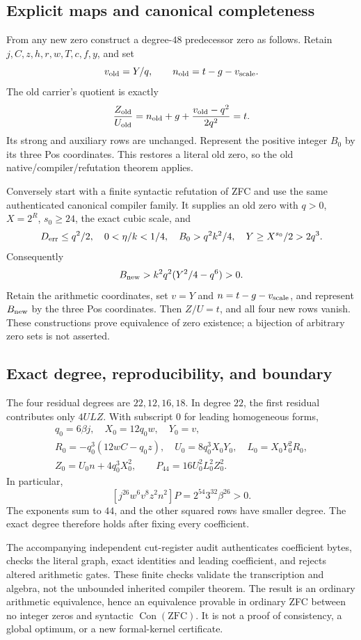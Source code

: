 \subsection{Explicit maps and canonical completeness}
From any new zero construct a degree-$48$ predecessor zero as follows.
Retain $j,C,z,h,r,w,T,c,f,y$, and set
\[
 v_{\rm old}=Y/q,\qquad n_{\rm old}=t-g-v_{\rm scale}.
\]
The old carrier's quotient is exactly
\[
 \frac{Z_{\rm old}}{U_{\rm old}}
 =n_{\rm old}+g+\frac{v_{\rm old}-q^2}{2q^2}=t.
\]
Its strong and auxiliary rows are unchanged. Represent the positive
integer $B_0$ by its three Pos coordinates. This restores a literal
old zero, so the old native/compiler/refutation theorem applies.

Conversely start with a finite syntactic refutation of ZFC and use the
same authenticated canonical compiler family. It supplies an old zero
with $q>0$, $X=2^R$, $s_0\ge24$, the exact cubic scale, and
\[
 D_{\rm err}\le q^2/2,\quad 0<\eta/k<1/4,\quad
 B_0>q^2k^2/4,\quad Y\ge X^{s_0}/2>2q^3.
\]
Consequently
\[
 B_{\rm new}>k^2q^2(Y^2/4-q^6)>0.
\]
Retain the arithmetic coordinates, set $v=Y$ and
$n=t-g-v_{\rm scale}$, and represent $B_{\rm new}$ by the three Pos
coordinates. Then $Z/U=t$, and all four new rows vanish.
These constructions prove equivalence of zero existence; a bijection
of arbitrary zero sets is not asserted.

\subsection{Exact degree, reproducibility, and boundary}
The four residual degrees are $22,12,16,18$. In degree $22$, the
first residual contributes only $4ULZ$. With subscript $0$ for
leading homogeneous forms,
\begin{gather*}
 q_0=6\beta j,\quad X_0=12q_0w,\quad Y_0=v,\\
 R_0=-q_0^3(12wC-q_0z),\quad
 U_0=8q_0^3X_0Y_0,\quad L_0=X_0Y_0^2R_0,\\
 Z_0=U_0n+4q_0^3X_0^2,\qquad P_{44}=16U_0^2L_0^2Z_0^2.
\end{gather*}
In particular,
\[
 [j^{26}w^6v^8z^2n^2]P=2^{54}3^{32}\beta^{26}>0.
\]
The exponents sum to $44$, and the other squared rows have smaller
degree. The exact degree therefore holds after fixing every coefficient.

The accompanying independent cut-register audit authenticates coefficient
bytes, checks the literal graph, exact identities and leading coefficient,
and rejects altered arithmetic gates. These finite checks validate the
transcription and algebra, not the unbounded inherited compiler theorem.
The result is an ordinary arithmetic equivalence, hence an equivalence
provable in ordinary ZFC between no integer zeros and syntactic
$\operatorname{Con}(\mathrm{ZFC})$. It is not a proof of consistency,
a global optimum, or a new formal-kernel certificate.
